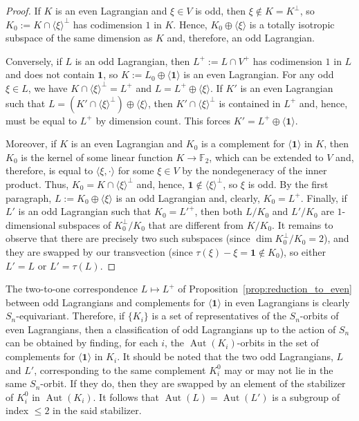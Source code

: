 \documentclass[a4paper,reqno]{amsart}
\newcommand{\bydef}{:=}
\newcommand{\buno}{\mathbf{1}}
\newcommand{\FF}{\mathbb{F}}
\DeclareMathOperator{\Aut}{\mathrm{Aut}}%
\theoremstyle{definition}
\theoremstyle{remark} \newtheorem{remark}[theorem]{Remark}
\numberwithin{equation}{section}
\begin{document}
\begin{proof}
If $K$ is an even Lagrangian and $\xi\in V$ is odd, then $\xi\notin K=K^\perp$, so $K_0 \bydef K\cap\langle\xi\rangle^\perp$ has codimension $1$ in $K$. Hence, $K_0\oplus\langle\xi\rangle$ is a totally isotropic subspace of the same dimension as $K$ and, therefore, an odd Lagrangian.

Conversely, if $L$ is an odd Lagrangian, then $L^+\bydef L\cap V^+$ has codimension $1$ in $L$ and does not contain $\buno$, so $K \bydef L_0\oplus\langle\buno\rangle$ is an even Lagrangian. For any odd $\xi\in L$, we have $K\cap\langle\xi\rangle^\perp=L^+$ and $L=L^+\oplus\langle\xi\rangle$. If $K'$ is an even Lagrangian such that $L=(K'\cap\langle\xi\rangle^\perp)\oplus\langle\xi\rangle$, then $K'\cap\langle\xi\rangle^\perp$ is contained in $L^+$ and, hence, must be equal to $L^+$ by dimension count. This forces $K'=L^+\oplus\langle\buno\rangle$.

Moreover, if $K$ is an even Lagrangian and $K_0$ is a complement for $\langle\buno\rangle$ in $K$, then $K_0$ is the kernel of some linear function $K\to\FF_2$, which can be extended to $V$ and, therefore, is equal to $\langle\xi,\cdot\rangle$ for some $\xi\in V$ by the nondegeneracy of the inner product. Thus, $K_0=K\cap\langle\xi\rangle^\perp$ and, hence, $\buno\notin\langle\xi\rangle^\perp$, so $\xi$ is odd. By the first paragraph, $L \bydef K_0\oplus\langle\xi\rangle$ is an odd Lagrangian and, clearly, $K_0=L^+$. Finally, if $L'$ is an odd Lagrangian such that $K_0=L'^+$, then both $L/K_0$ and $L'/K_0$ are $1$-dimensional subspaces of $K_0^\perp/K_0$ that are different from $K/K_0$. It remains to observe that there are precisely two such subspaces (since $\dim K_0^\perp/K_0=2$), and they are swapped by our transvection (since $\tau(\xi)-\xi=\buno\notin K_0$), so either $L'=L$ or $L'=\tau(L)$.
\end{proof}

The two-to-one correspondence $L\mapsto L^+$ of Proposition~\ref{prop:reduction_to_even} between odd Lagrangians and complements for $\langle\buno\rangle$ in even Lagrangians is clearly $S_n$-equivariant. Therefore, if $\{K_i\}$ is a set of representatives of the $S_n$-orbits of even Lagrangians, then a classification of odd Lagrangians up to the action of $S_n$ can be obtained by finding, for each $i$, the $\Aut(K_i)$-orbits in the set of complements for $\langle\buno\rangle$ in $K_i$. It should be noted that the two odd Lagrangians, $L$ and $L'$, corresponding to the same complement $K_i^0$ may or may not lie in the same $S_n$-orbit. If they do, then they are swapped by an element of the stabilizer of $K_i^0$ in $\Aut(K_i)$. It follows that $\Aut(L)=\Aut(L')$ is a subgroup of index $\le 2$ in the said stabilizer. 
\end{document}
